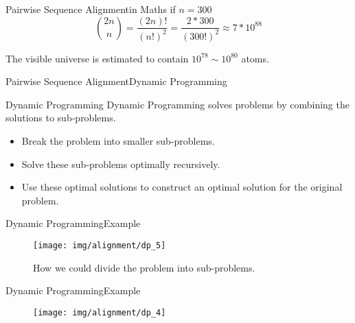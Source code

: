 \documentclass[10pt]{beamer}
\newcommand{\1}{
	\setbeamertemplate{background}{
		\texttt{[image: img/1]}
		\tikz[overlay] \fill[fill opacity=0.75,fill=white] (0,0) rectangle (-\paperwidth,\paperheight);
	}
}
\begin{document}
\begin{frame}{Pairwise Sequence Alignment}{in Maths}	
	if $n=300$
	\[
	\binom{2n}{n} = \frac{ (2n)! }{(n!)^2} = \frac{ 2*300 }{(300!)^2}  \approx 7*10^{88}
	\]
	
	The visible universe is estimated to contain $10^{78} \sim 10^{80}$ atoms.
	
\end{frame}


\begin{frame}{Pairwise Sequence Alignment}{Dynamic Programming}	
	\begin{block}{Dynamic Programming}
		Dynamic Programming solves problems by combining the solutions to sub‐problems.
		\begin{itemize}
			\item Break the problem into smaller sub‐problems.
			\item Solve these sub‐problems optimally recursively.
			\item Use these optimal solutions to construct an optimal solution for the original problem.
		\end{itemize}
	\end{block}
\end{frame}

\begin{frame}{Dynamic Programming}{Example}		
	\begin{figure}[]
		\centering
		\texttt{[image: img/alignment/dp\_5]}
		\label{img:uniprot}
		\caption{How we could divide the problem into sub-problems.}
	\end{figure}	

\end{frame}


\begin{frame}{Dynamic Programming}{Example}		
	\begin{figure}[]
		\centering
		\texttt{[image: img/alignment/dp\_4]}
		\label{img:uniprot}
	\end{figure}	
	
\end{frame}
\end{document}
